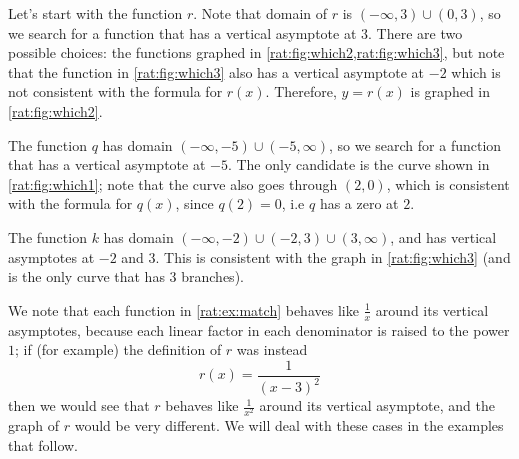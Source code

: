 \begin{pccexample}
	\begin{pccsolution}
		Let's start with the function $r$. Note that domain of $r$ is $(-\infty,3)\cup(0,3)$, so 
		we search for a function that has a vertical asymptote at $3$. There 
		are two possible choices: the functions graphed in \cref{rat:fig:which2,rat:fig:which3}, 
		but note that the function in \cref{rat:fig:which3} also has a vertical asymptote at $-2$ 
		which is not consistent with the formula for $r(x)$. Therefore, $y=r(x)$
		is graphed in \cref{rat:fig:which2}. 
		
		The function $q$ has domain $(-\infty,-5)\cup(-5,\infty)$, so we search 
		for a function that has a vertical asymptote at $-5$. The only candidate 
		is the curve shown in \cref{rat:fig:which1}; note that the curve also goes through $(2,0)$, 
		which is consistent with the formula for $q(x)$, since $q(2)=0$, i.e $q$
		has a zero at $2$.
		
		The function $k$ has domain $(-\infty,-2)\cup(-2,3)\cup(3,\infty)$, and 
		has vertical asymptotes at $-2$ and $3$. This is consistent with 
		the graph in \cref{rat:fig:which3} (and is the only curve that 
		has $3$ branches).
	\end{pccsolution}
\end{pccexample}

We note that each function in \cref{rat:ex:match} behaves like $\frac{1}{x}$ around its vertical asymptotes, 
because each linear factor in each denominator is raised to the power $1$; if (for example) 
the definition of $r$ was instead
\[
	r(x)=\frac{1}{(x-3)^2}
\]
then we would see that $r$ behaves like $\frac{1}{x^2}$ around its vertical asymptote, and 
the graph of $r$ would be very different. We will deal with these cases in the examples that follow.

